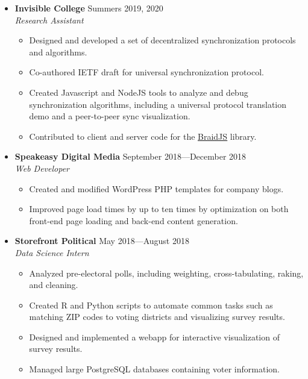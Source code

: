 \documentclass[12pt,letterpaper]{article}
\newenvironment{explist}
{\begin{itemize}[label=\textbf{--},itemsep=1pt,topsep=0pt,partopsep=0pt,parsep=0pt]}
{\end{itemize}}
\begin{document}
\begin{itemize}[label=,itemsep=0pt]
	\item 
	\textbf{Invisible College} \hfill Summers 2019, 2020\\
	\textit{Research Assistant}
	\begin{explist}
		\item Designed and developed a set of decentralized synchronization protocols and algorithms.
		\item Co-authored IETF draft for universal synchronization protocol.
		\item Created Javascript and NodeJS tools to analyze and debug synchronization algorithms, including a universal protocol translation demo and a peer-to-peer sync visualization.
        \item Contributed to client and server code for the \underline{\href{https://github.com/braid-work/braidjs}{BraidJS}} library.
	\end{explist}

	\item
	\textbf{Speakeasy Digital Media} \hfill September 2018---December 2018\\
	\textit{Web Developer}
	\begin{explist}
		\item Created and modified WordPress PHP templates for company blogs.
		\item Improved page load times by up to ten times by optimization on both front-end page loading and back-end content generation.
	\end{explist}
	
	\item
	\textbf{Storefront Political} \hfill May 2018---August 2018\\
	\textit{Data Science Intern}
	\begin{explist}
		\item Analyzed pre-electoral polls, including weighting, cross-tabulating, raking, and cleaning.
		\item Created R and Python scripts to automate common tasks such as matching ZIP codes to voting districts and visualizing survey results.
		\item Designed and implemented a webapp for interactive visualization of survey results.
		\item Managed large PostgreSQL databases containing voter information.
	\end{explist}


\end{itemize}

\end{document}
